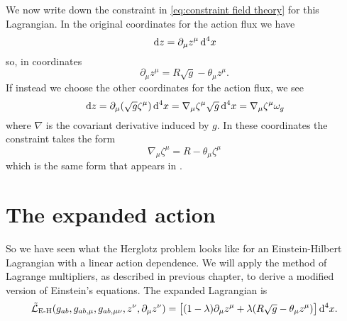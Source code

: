 \documentclass[../main.tex]{subfiles}
\begin{document}
We now write down the constraint in \cref{eq:constraint field theory} for this Lagrangian.
In the original coordinates for the action flux we have
\begin{equation*}
	\,\mathrm{d} z = \partial_\mu z^\mu \,\mathrm{d}^4 x
\end{equation*}
so, in coordinates
\begin{equation} \label{eq:constraint coordinates 1}
	\partial_\mu z^\mu = R\sqrt{g} - \theta_\mu z^\mu. 
\end{equation}
If instead we choose the other coordinates for the action flux, we see
\begin{equation*}
	\,\mathrm{d} z = \partial_\mu (\sqrt{g} \zeta^\mu) \,\mathrm{d}^4 x = \nabla_\mu \zeta^\mu \sqrt{g}\,\mathrm{d}^4x
	= \nabla_\mu \zeta^\mu \omega_g
\end{equation*}
where \( \nabla \) is the covariant derivative induced by \( g \). In these coordinates
the constraint takes the form
\begin{equation} \label{eq:constraint coordinates 2}
	\nabla_\mu \zeta^\mu = R - \theta_\mu \zeta^\mu
\end{equation}
which is the same form that appears in \cite{Lazo2017}. 

\section{The expanded action}
So we have seen what the Herglotz problem looks like for an Einstein-Hilbert Lagrangian
with a linear action dependence. We will apply the method of Lagrange multipliers, as
described in previous chapter, to derive a modified version of Einstein's equations. The
expanded Lagrangian is
\begin{equation*}
	\tilde{\mathcal{L}}_\text{E-H}(g_{ab}, g_{ab,\mu}, g_{ab,\mu\nu}, z^\nu, \partial_\mu z^\nu) =
	\big[(1-\lambda) \partial_\mu z^\mu + \lambda(R\sqrt{g} - \theta_\mu z^\mu)\big] \,\mathrm{d}^4
	x.
\end{equation*}
\end{document}

